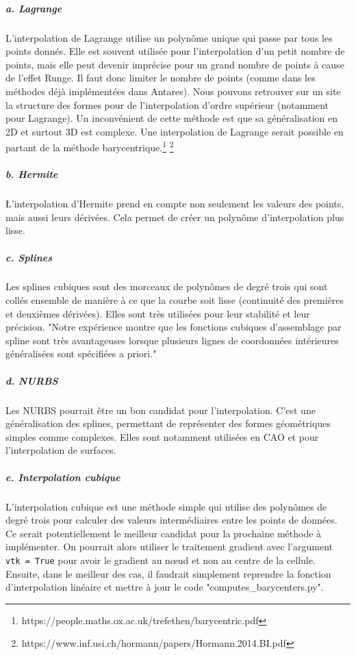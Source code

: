 \subparagraph{a. Lagrange}

L'interpolation de Lagrange utilise un polynôme unique qui passe par tous les points donnés. Elle est souvent utilisée pour l'interpolation d'un petit nombre de points, mais elle peut devenir imprécise pour un grand nombre de points à cause de l'effet Runge. Il faut donc limiter le nombre de points (comme dans les méthodes déjà implémentées dans Antares).
Nous pouvons retrouver sur un site\cite{structure} la structure des formes pour de l'interpolation d'ordre supérieur (notamment pour Lagrange). Un inconvénient de cette méthode est que sa généralisation en 2D et surtout 3D est complexe.
Une interpolation de Lagrange serait possible en partant de la méthode barycentrique.\footnote{https://people.maths.ox.ac.uk/trefethen/barycentric.pdf} \footnote{https://www.inf.usi.ch/hormann/papers/Hormann.2014.BI.pdf}


\subparagraph{b. Hermite\cite{bajaj}}

\L'interpolation d'Hermite prend en compte non seulement les valeurs des points, mais aussi leurs dérivées. Cela permet de créer un polynôme d'interpolation plus lisse.

\subparagraph{c. Splines}

Les splines cubiques sont des morceaux de polynômes de degré trois qui sont collés ensemble de manière à ce que la courbe soit lisse (continuité des premières et deuxièmes dérivées). Elles sont très utilisées pour leur stabilité et leur précision.
"Notre expérience montre que les fonctions cubiques d'assemblage par spline sont très avantageuses lorsque plusieurs lignes de coordonnées intérieures généralisées sont spécifiées a priori."\cite{gordont1971}

\subparagraph{d. NURBS}

Les \ac{NURBS}\cite{piegl1995nurbs} pourrait être un bon candidat pour l'interpolation. C'est une généralisation des splines, permettant de représenter des formes géométriques simples comme complexes. Elles sont notamment utilisées en CAO et pour l'interpolation de surfaces.\cite{surface}

\subparagraph{e. Interpolation cubique}
L'interpolation cubique est une méthode simple qui utilise des polynômes de degré trois pour calculer des valeurs intermédiaires entre les points de données.\cite{tanaka} Ce serait potentiellement le meilleur candidat pour la prochaine méthode à implémenter. On pourrait alors utiliser le traitement gradient avec l'argument \texttt{vtk = True} pour avoir le gradient au nœud et non au centre de la cellule. Ensuite, dans le meilleur des cas, il faudrait simplement reprendre la fonction d'interpolation linéaire et mettre à jour le code "computes\_barycenters.py".



